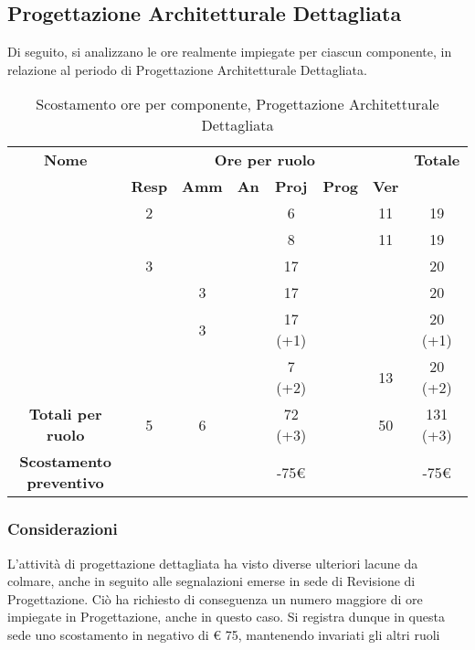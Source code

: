 \newpage
\subsection{Progettazione Architetturale Dettagliata}

Di seguito, si analizzano le ore realmente impiegate per ciascun componente, in relazione al periodo di Progettazione Architetturale Dettagliata.

\begin{table}[H]
	\begin{center}
		\begin{tabular}{|c|c|c|c|c|c|c|c|}
			\hline
			\textbf{Nome} & \multicolumn{6}{c|}{\textbf{Ore per ruolo}} & \textbf{Totale} \\\cline{2-7}
			& \textbf{Resp} & \textbf{Amm} & \textbf{An} & \textbf{Proj} & \textbf{Prog} & \textbf{Ver} & \\
			\hline
			\MC			&	2	&		&		&	6	&		&	11	&	19	\\
			\hline
			\AN			&		&		&		&	8	&   	&	11	& 	19	\\
			\hline
			\DAN		&	3	&		&		&	17	&		&		&	20	\\
			\hline
			\AS			&		&	3	&	 	&	17	&	 	& 		&	20	\\
			\hline
			\NS 		&		&	3	&		&	17 (+1)	&		& 		&	20 (+1)	\\
			\hline
			\DS			& 		&		&		&	7 (+2)	&		&	13	&	20 (+2)	\\
			\hline
			\textbf{Totali per ruolo}	& 	5 	&	6 	&		&	72 (+3)	&		&	50 	&	131 (+3)	\\
			\hline
			\textbf{Scostamento preventivo}	& 		&		&		&	-75€	&		&		&	-75€	\\
			\hline
		\end{tabular}
	\end{center}
	\caption{Scostamento ore per componente, Progettazione Architetturale Dettagliata}
\end{table}


\subsubsection{Considerazioni}
L'attività di progettazione dettagliata ha visto diverse ulteriori lacune da colmare, anche in seguito alle segnalazioni emerse in sede di Revisione di Progettazione. Ciò ha richiesto di conseguenza un numero maggiore di ore impiegate in Progettazione, anche in questo caso. Si registra dunque in questa sede uno scostamento in negativo di € 75, mantenendo invariati gli altri ruoli

